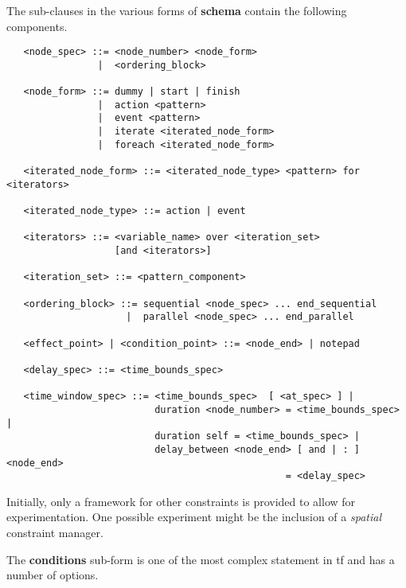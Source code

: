 The sub-clauses in the various forms of {\bf schema} contain
the following components.

\begin{verbatim}
   <node_spec> ::= <node_number> <node_form>
                |  <ordering_block>

   <node_form> ::= dummy | start | finish
                |  action <pattern>
                |  event <pattern>
                |  iterate <iterated_node_form>
                |  foreach <iterated_node_form>

   <iterated_node_form> ::= <iterated_node_type> <pattern> for <iterators>

   <iterated_node_type> ::= action | event

   <iterators> ::= <variable_name> over <iteration_set>
                   [and <iterators>]

   <iteration_set> ::= <pattern_component>

   <ordering_block> ::= sequential <node_spec> ... end_sequential
                     |  parallel <node_spec> ... end_parallel

   <effect_point> | <condition_point> ::= <node_end> | notepad

   <delay_spec> ::= <time_bounds_spec>

   <time_window_spec> ::= <time_bounds_spec>  [ <at_spec> ] |
                          duration <node_number> = <time_bounds_spec> |
                          duration self = <time_bounds_spec> |
                          delay_between <node_end> [ and | : ] <node_end>
                                                 = <delay_spec>
\end{verbatim}

Initially, only a framework for other constraints is provided to allow
for experimentation.  One possible experiment might be the inclusion
of a {\em spatial} constraint manager.

The {\bf conditions} sub-form is one of the most complex
statement in {\sc tf} and has a number of options.

